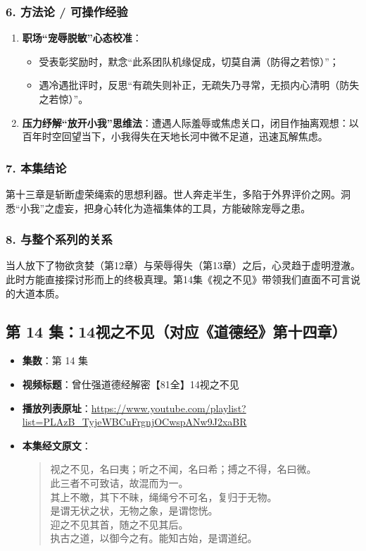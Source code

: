\subsubsection{6. 方法论 / 可操作经验}
\begin{enumerate}
    \item \textbf{职场“宠辱脱敏”心态校准}：
    \begin{itemize}
        \item 受表彰奖励时，默念“此系团队机缘促成，切莫自满（防得之若惊）”；
        \item 遇冷遇批评时，反思“有疏失则补正，无疏失乃寻常，无损内心清明（防失之若惊）”。
    \end{itemize}
    \item \textbf{压力纾解“放开小我”思维法}：遭遇人际羞辱或焦虑关口，闭目作抽离观想：以百年时空回望当下，小我得失在天地长河中微不足道，迅速瓦解焦虑。
\end{enumerate}

\subsubsection{7. 本集结论}
第十三章是斩断虚荣绳索的思想利器。世人奔走半生，多陷于外界评价之网。洞悉“小我”之虚妄，把身心转化为造福集体的工具，方能破除宠辱之患。

\subsubsection{8. 与整个系列的关系}
当人放下了物欲贪婪（第12章）与荣辱得失（第13章）之后，心灵趋于虚明澄澈。此时方能直接探讨形而上的终极真理。第14集《视之不见》带领我们直面不可言说的大道本质。

\clearpage

\subsection{第 14 集：14视之不见（对应《道德经》第十四章）}
\label{sec:ep14}

\begin{itemize}
    \item \textbf{集数}：第 14 集
    \item \textbf{视频标题}：曾仕强道德经解密【81全】14视之不见
    \item \textbf{播放列表原址}：\url{https://www.youtube.com/playlist?list=PLAzB_TyjeWBCuFrgnjOCwspANw9J2xaBR}
    \item \textbf{本集经文原文}：
    \begin{quote}\kaishu
    视之不见，名曰夷；听之不闻，名曰希；搏之不得，名曰微。\\
    此三者不可致诘，故混而为一。\\
    其上不皦，其下不昧，绳绳兮不可名，复归于无物。\\
    是谓无状之状，无物之象，是谓惚恍。\\
    迎之不见其首，随之不见其后。\\
    执古之道，以御今之有。能知古始，是谓道纪。
    \end{quote}
\end{itemize}

